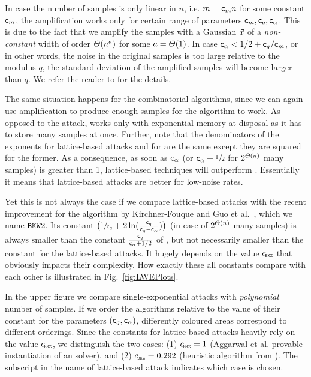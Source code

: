 In case the number of samples is only linear in $n$, i.e. $m = \mathsf{c}_m n$ for some constant $\mathsf{c}_m$, the amplification works only for certain range of parameters $\mathsf{c}_m, \mathsf{c}_q, \mathsf{c}_{\alpha}$. This is due to the fact that we amplify the samples with a Gaussian $\vec x$ of a \emph{non-constant} width of order $\varTheta(n^{a})$ for some $a=\varTheta(1)$. In case $\mathsf{c}_{\alpha}<1/2+\mathsf{c}_q/\mathsf{c}_m$, or in other words, the noise in the original samples is too large relative to the modulus $q$, the standard deviation of the amplified samples will become larger than $q$. We refer the reader to \cite[Lemma 10]{DCC:HKM} for the details.

The same situation happens for the combinatorial \BKW algorithms, since we can again use amplification to produce enough samples for the algorithm to work. As opposed to the \DUAL attack, \BKW works only with exponential memory at disposal as it has to store many samples at once. 
Further, note that the denominators of the exponents for lattice-based attacks and for \BKW are the same except they are squared for the former. As a consequence, as soon as $\mathsf{c}_{\alpha}$ (or $\mathsf{c}_{\alpha}+\sfrac12$ for $2^{\varTheta(n)}$ many samples) is greater than 1, lattice-based techniques will outperform \BKW. Essentially it means that lattice-based attacks are better for low-noise rates.

Yet this is not always the case if we compare lattice-based attacks with the recent improvement for the \BKW algorithm by Kirchner-Fouque \cite{C:KirFou15} and Guo et al.\ \cite{C:GuoJohSta15}, which we name $\texttt{BKW}2$. Its constant $\bigl(\sfrac{1}{\mathsf{c}_q} + 2\ln(\tfrac{\mathsf{c}_q}{\mathsf{c}_q-\mathsf{c}_{\alpha}})\bigr)$ (in case of $2^{\varTheta(n)}$ many samples) is always smaller than the constant $\frac{\mathsf{c}_q}{\mathsf{c}_{\alpha}+1/2}$ of \BKW, but not necessarily smaller than the constant for the lattice-based attacks. It hugely depends on the value $\cBKZ$ that obviously impacts their complexity. How exactly these all constants compare with each other is illustrated in Fig.~\ref{fig:LWEPlots}.

  
In the upper figure we compare single-exponential attacks with \emph{polynomial} number of \LWE samples. If we order the algorithms relative to the value of their constant for the parameters $(\mathsf{c}_q, \mathsf{c}_{\alpha})$, differently coloured areas correspond to different orderings. Since the constants for lattice-based attacks heavily rely on the value $\cBKZ$, we distinguish the two cases: (1) $\cBKZ = 1$ (Aggarwal et al. \cite{STOC:ADRS15} provable instantiation of an \SVP solver), and (2) $\cBKZ = 0.292$ (heuristic \SVP algorithm from \cite{SODA:BDGL16}). The subscript in the name of lattice-based attack indicates which case is chosen.  

